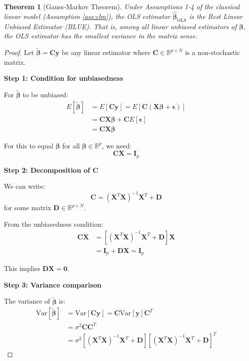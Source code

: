 \documentclass{article}
\newtheorem{theorem}{Theorem}
\begin{document}
\begin{theorem}[Gauss-Markov Theorem]
Under Assumptions 1-4 of the classical linear model (Assumption \ref{ass:clm}), the OLS estimator $\hat{\boldsymbol{\beta}}_{\text{OLS}}$ is the Best Linear Unbiased Estimator (BLUE). That is, among all linear unbiased estimators of $\boldsymbol{\beta}$, the OLS estimator has the smallest variance in the matrix sense.
\end{theorem}

\begin{proof}
Let $\tilde{\boldsymbol{\beta}} = \mathbf{C}\mathbf{y}$ be any linear estimator where $\mathbf{C} \in \mathbb{R}^{p \times N}$ is a non-stochastic matrix.

\textbf{Step 1: Condition for unbiasedness}

For $\tilde{\boldsymbol{\beta}}$ to be unbiased:
\begin{align}
E[\tilde{\boldsymbol{\beta}}] &= E[\mathbf{C}\mathbf{y}] = E[\mathbf{C}(\mathbf{X}\boldsymbol{\beta} + \boldsymbol{\epsilon})] \\
&= \mathbf{C}\mathbf{X}\boldsymbol{\beta} + \mathbf{C}E[\boldsymbol{\epsilon}] \\
&= \mathbf{C}\mathbf{X}\boldsymbol{\beta}
\end{align}

For this to equal $\boldsymbol{\beta}$ for all $\boldsymbol{\beta} \in \mathbb{R}^p$, we need:
\begin{equation}
\mathbf{C}\mathbf{X} = \mathbf{I}_p
\end{equation}

\textbf{Step 2: Decomposition of $\mathbf{C}$}

We can write:
\begin{equation}
\mathbf{C} = (\mathbf{X}^T\mathbf{X})^{-1}\mathbf{X}^T + \mathbf{D}
\end{equation}
for some matrix $\mathbf{D} \in \mathbb{R}^{p \times N}$.

From the unbiasedness condition:
\begin{align}
\mathbf{C}\mathbf{X} &= [(\mathbf{X}^T\mathbf{X})^{-1}\mathbf{X}^T + \mathbf{D}]\mathbf{X} \\
&= \mathbf{I}_p + \mathbf{D}\mathbf{X} = \mathbf{I}_p
\end{align}

This implies $\mathbf{D}\mathbf{X} = \mathbf{0}$.

\textbf{Step 3: Variance comparison}

The variance of $\tilde{\boldsymbol{\beta}}$ is:
\begin{align}
\text{Var}[\tilde{\boldsymbol{\beta}}] &= \text{Var}[\mathbf{C}\mathbf{y}] = \mathbf{C}\text{Var}[\mathbf{y}]\mathbf{C}^T \\
&= \sigma^2\mathbf{C}\mathbf{C}^T \\
&= \sigma^2[(\mathbf{X}^T\mathbf{X})^{-1}\mathbf{X}^T + \mathbf{D}][(\mathbf{X}^T\mathbf{X})^{-1}\mathbf{X}^T + \mathbf{D}]^T
\end{align}


\end{proof}
\end{document}
